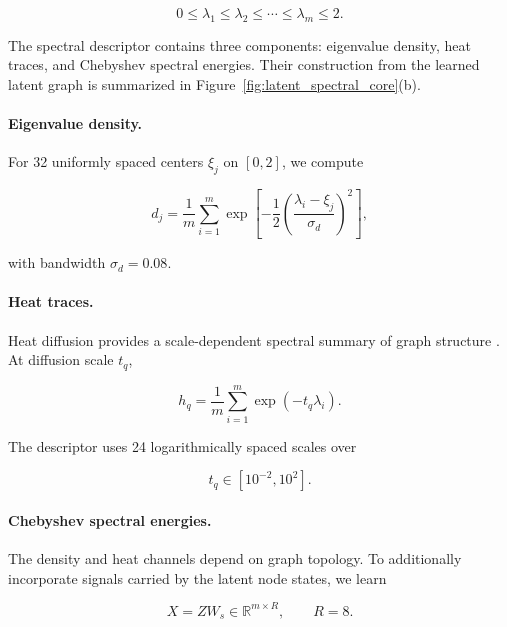 \documentclass[authoryear,final,5p,times,twocolumn]{elsarticle}
\theoremstyle{plain}
\begin{document}
\begin{equation}
\label{eq:latent_eigenvalues}
0
\leq
\lambda_1
\leq
\lambda_2
\leq
\cdots
\leq
\lambda_m
\leq
2.
\end{equation}

The spectral descriptor contains three components: eigenvalue density, heat
traces, and Chebyshev spectral energies. Their construction from the learned
latent graph is summarized in
Figure~\ref{fig:latent_spectral_core}(b).

\paragraph{Eigenvalue density.}
For 32 uniformly spaced centers $\xi_j$ on $[0,2]$, we compute

\begin{equation}
\label{eq:eigen_density}
d_j
=
\frac{1}{m}
\sum_{i=1}^{m}
\exp
\left[
    -
    \frac{1}{2}
    \left(
        \frac{
            \lambda_i-\xi_j
        }{
            \sigma_d
        }
    \right)^2
\right],
\end{equation}

with bandwidth $\sigma_d=0.08$.

\paragraph{Heat traces.}
Heat diffusion provides a scale-dependent spectral summary of graph structure
\cite{??}. At diffusion scale $t_q$,

\begin{equation}
\label{eq:heat_trace}
h_q
=
\frac{1}{m}
\sum_{i=1}^{m}
\exp(-t_q\lambda_i).
\end{equation}

The descriptor uses 24 logarithmically spaced scales over

\begin{equation}
t_q
\in
[10^{-2},10^{2}].
\end{equation}

\paragraph{Chebyshev spectral energies.}
The density and heat channels depend on graph topology. To additionally
incorporate signals carried by the latent node states, we learn

\begin{equation}
\label{eq:spectral_signals}
X
=
ZW_s
\in
\mathbb{R}^{m\times R},
\qquad
R=8.
\end{equation}
\end{document}
